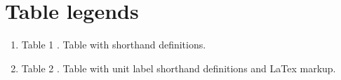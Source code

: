 \section{Table legends}\label{table-legends}


\begin{enumerate}
\def\labelenumi{(\arabic{enumi})}
\item
  Table 1 . Table with shorthand definitions.
\item
  Table 2 . Table with unit label shorthand definitions and LaTex
  markup.
\end{enumerate}
